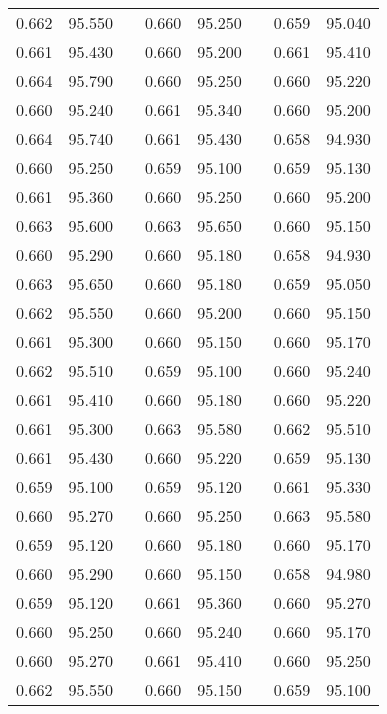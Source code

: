\documentclass[12pt]{mwrep}
\begin{document}
\begin{table}[H]
\begin{tabularx}{\textwidth}{|Y|Y|p{2mm}|Y|Y|p{2mm}|Y|Y|}
			0.662 & 95.550 && 0.660 & 95.250 && 0.659 & 95.040 \\
			0.661 & 95.430 && 0.660 & 95.200 && 0.661 & 95.410 \\
			0.664 & 95.790 && 0.660 & 95.250 && 0.660 & 95.220 \\
			0.660 & 95.240 && 0.661 & 95.340 && 0.660 & 95.200 \\
			0.664 & 95.740 && 0.661 & 95.430 && 0.658 & 94.930 \\
			0.660 & 95.250 && 0.659 & 95.100 && 0.659 & 95.130 \\
			0.661 & 95.360 && 0.660 & 95.250 && 0.660 & 95.200 \\
			0.663 & 95.600 && 0.663 & 95.650 && 0.660 & 95.150 \\
			0.660 & 95.290 && 0.660 & 95.180 && 0.658 & 94.930 \\
			0.663 & 95.650 && 0.660 & 95.180 && 0.659 & 95.050 \\
			0.662 & 95.550 && 0.660 & 95.200 && 0.660 & 95.150 \\
			0.661 & 95.300 && 0.660 & 95.150 && 0.660 & 95.170 \\
			0.662 & 95.510 && 0.659 & 95.100 && 0.660 & 95.240 \\
			0.661 & 95.410 && 0.660 & 95.180 && 0.660 & 95.220 \\
			0.661 & 95.300 && 0.663 & 95.580 && 0.662 & 95.510 \\
			0.661 & 95.430 && 0.660 & 95.220 && 0.659 & 95.130 \\
			0.659 & 95.100 && 0.659 & 95.120 && 0.661 & 95.330 \\
			0.660 & 95.270 && 0.660 & 95.250 && 0.663 & 95.580 \\
			0.659 & 95.120 && 0.660 & 95.180 && 0.660 & 95.170 \\
			0.660 & 95.290 && 0.660 & 95.150 && 0.658 & 94.980 \\
			0.659 & 95.120 && 0.661 & 95.360 && 0.660 & 95.270 \\
			0.660 & 95.250 && 0.660 & 95.240 && 0.660 & 95.170 \\
			0.660 & 95.270 && 0.661 & 95.410 && 0.660 & 95.250 \\
			0.662 & 95.550 && 0.660 & 95.150 && 0.659 & 95.100 \\		
		\end{tabularx}	
	\end{table}
	
\end{document}
